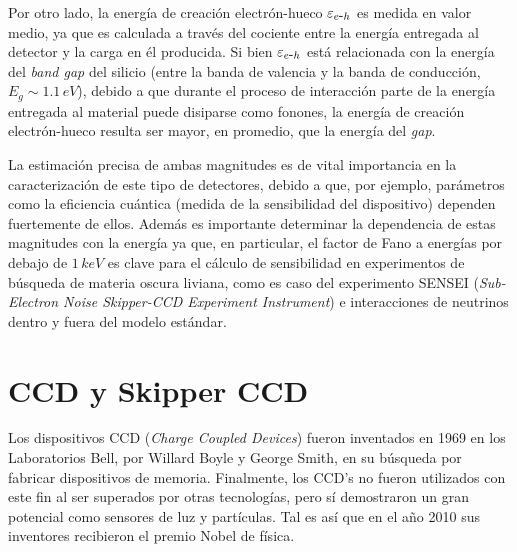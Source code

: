 Por otro lado, la energía de creación electrón-hueco $\varepsilon_{e\mbox{-}h}$ es medida en valor medio, ya que es calculada a través del cociente entre la energía entregada al detector y la carga en él producida. Si bien $\varepsilon_{e\mbox{-}h}$ está relacionada con la energía del \textit{band gap} del silicio (entre la banda de valencia y la banda de conducción, $E_{g}\sim 1.1\,\si{eV}$\cite{Janesick}), debido a que durante el proceso de interacción parte de la energía entregada al material puede disiparse como fonones, la energía de creación electrón-hueco resulta ser mayor, en promedio, que la energía del \textit{gap}.

La estimación precisa de ambas magnitudes es de vital importancia en la caracterización de este tipo de detectores, debido a que, por ejemplo, parámetros como la eficiencia cuántica (medida de la sensibilidad del dispositivo) dependen fuertemente de ellos\cite{kotov2}. Además es importante determinar la dependencia de estas magnitudes con la energía ya que, en particular, el factor de Fano a energías por debajo de $1\,\si{keV}$ es clave para el cálculo de sensibilidad en experimentos de búsqueda de materia oscura liviana, como es caso del experimento SENSEI (\textit{Sub-Electron Noise Skipper-CCD Experiment Instrument})\cite{barak} e interacciones de neutrinos dentro\cite{moroni1} y fuera del modelo estándar\cite{moroni2}.

\section{CCD y Skipper CCD}
\noindent Los dispositivos CCD (\textit{Charge Coupled Devices}) fueron inventados en 1969 en los Laboratorios Bell, por Willard Boyle y George Smith, en su búsqueda por fabricar dispositivos de memoria. Finalmente, los CCD's no fueron utilizados con este fin al ser superados por otras tecnologías, pero sí demostraron un gran potencial como sensores de luz y partículas. Tal es así que en el año 2010 sus inventores recibieron el premio Nobel de física\cite{Boyle, Smith}.

